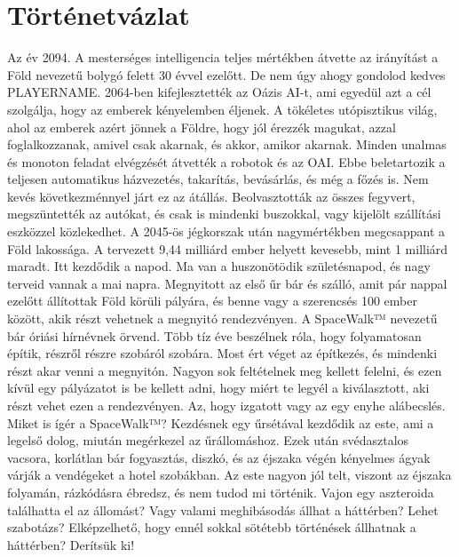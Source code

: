 \documentclass{scrarticle}
\begin{document}
\section{Történetvázlat}
Az év 2094. A mesterséges intelligencia teljes mértékben átvette az irányítást a Föld nevezetű bolygó felett 30 évvel ezelőtt. De nem úgy ahogy gondolod kedves PLAYERNAME. 2064-ben kifejlesztették az Oázis AI-t, ami egyedül azt a cél szolgálja, hogy az emberek kényelemben éljenek. A tökéletes utópisztikus világ, ahol az emberek azért jönnek a Földre, hogy jól érezzék magukat, azzal foglalkozzanak, amivel csak akarnak, és akkor, amikor akarnak. Minden unalmas és monoton feladat elvégzését átvették a robotok és az OAI. Ebbe beletartozik a teljesen automatikus házvezetés, takarítás, bevásárlás, és még a főzés is. Nem kevés következménnyel járt ez az átállás. Beolvasztották az összes fegyvert, megszüntették az autókat, és csak is mindenki buszokkal, vagy kijelölt szállítási eszközzel közlekedhet. A 2045-ös jégkorszak után nagymértékben megcsappant a Föld lakossága. A tervezett 9,44 milliárd ember helyett kevesebb, mint 1 milliárd maradt. Itt kezdődik a napod. Ma van a huszonötödik születésnapod, és nagy terveid vannak a mai napra. Megnyitott az első űr bár és szálló, amit pár nappal ezelőtt állítottak Föld körüli pályára, és benne vagy a szerencsés 100 ember között, akik részt vehetnek a megnyitó rendezvényen. A SpaceWalk™ nevezetű bár óriási hírnévnek örvend. Több tíz éve beszélnek róla, hogy folyamatosan építik, részről részre szobáról szobára. Most ért véget az építkezés, és mindenki részt akar venni a megnyitón. Nagyon sok feltételnek meg kellett felelni, és ezen kívül egy pályázatot is be kellett adni, hogy miért te legyél a kiválasztott, aki részt vehet ezen a rendezvényen. Az, hogy izgatott vagy az egy enyhe alábecslés. Miket is ígér a SpaceWalk™? Kezdésnek egy űrsétával kezdődik az este, ami a legelső dolog, miután megérkezel az űrállomáshoz. Ezek után svédasztalos vacsora, korlátlan bár fogyasztás, diszkó, és az éjszaka végén kényelmes ágyak várják a vendégeket a hotel szobákban.  Az este nagyon jól telt, viszont az éjszaka folyamán, rázkódásra ébredsz, és nem tudod mi történik. Vajon egy aszteroida találhatta el az állomást? Vagy valami meghibásodás állhat a háttérben? Lehet szabotázs? Elképzelhető, hogy ennél sokkal sötétebb történések állhatnak a háttérben? Derítsük ki!
\end{document}
